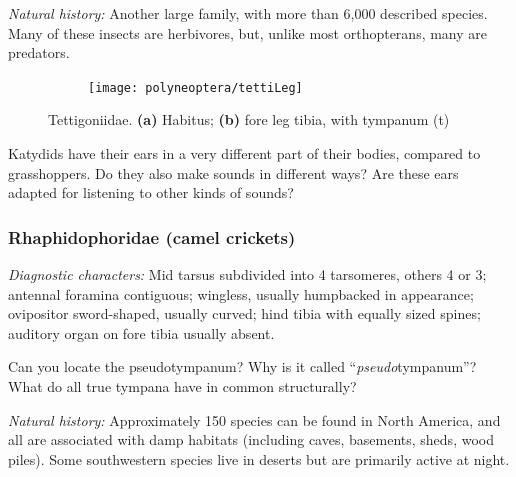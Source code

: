 \noindent{}\textit{Natural history:} Another large family, with more than 6,000 described species. Many of these insects are herbivores, but, unlike most orthopterans, many are predators.\vspace{3mm}

\begin{figure}[ht!]
    \centering
    \begin{subfigure}[ht!]{0.6\textwidth}
        \caption{}
        \label{fig:tettihabitus}
    \end{subfigure}
    \qquad
    \begin{subfigure}[ht!]{0.09\textwidth}
        \texttt{[image: polyneoptera/tettiLeg]}
        \caption{}
        \label{fig:tettiLeg}
    \end{subfigure}
    \caption{Tettigoniidae. \textbf{(a)} Habitus; \textbf{(b)} fore leg tibia, with tympanum (t) \citep[modified from][Figs. 20, 15A]{bhlitem15767}}\label{fig:tetti}
\end{figure}

\begin{theo}
{}Katydids have their ears in a very different part of their bodies, compared to grasshoppers. Do they also make sounds in different ways? Are these ears adapted for listening to other kinds of sounds?
\end{theo}

\subsubsection{Rhaphidophoridae (camel crickets)}
\noindent{}\textit{Diagnostic characters:} Mid tarsus subdivided into 4 tarsomeres, others 4 or 3; antennal foramina contiguous; wingless, usually humpbacked in appearance; ovipositor sword-shaped, usually curved; hind tibia with equally sized spines; auditory organ on fore tibia usually absent.\vspace{3mm}

\begin{theo}
{}Can you locate the pseudotympanum? Why is it called ``\textit{pseudo}tympanum''? What do all true tympana have in common structurally?
\end{theo}

\noindent{}\textit{Natural history:} Approximately 150 species can be found in North America, and all are associated with damp habitats (including caves, basements, sheds, wood piles). Some southwestern species live in deserts but are primarily active at night.\vspace{3mm}

